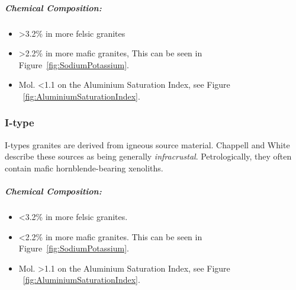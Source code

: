\documentclass[a4paper]{article}
\begin{document}
\subparagraph{Chemical Composition:}

\begin{itemize}
\item {} \textgreater 3.2\% in more felsic granites
\item {} \textgreater 2.2\% in more mafic granites, This can be seen in Figure~\ref{fig:SodiumPotassium}.
\item Mol.  \textless 1.1 on the Aluminium Saturation Index, see Figure  ~\ref{fig:AluminiumSaturationIndex}.
\end{itemize}
\cite{chappell2001two}

\subsubsection{I-type}
I-types granites are derived from igneous source material. Chappell and White describe these sources as being generally \textit{infracrustal}. Petrologically, they often contain mafic hornblende-bearing xenoliths.

\subparagraph{Chemical Composition:}
\begin{itemize}
\item {} \textless 3.2\% in more felsic granites.
\item {} \textless 2.2\% in more mafic granites. This can be seen in Figure~\ref{fig:SodiumPotassium}.
\item Mol.  \textgreater 1.1 on the Aluminium Saturation Index, see Figure  ~\ref{fig:AluminiumSaturationIndex}.
\end{itemize}
\cite{chappell2001two}
\end{document}

